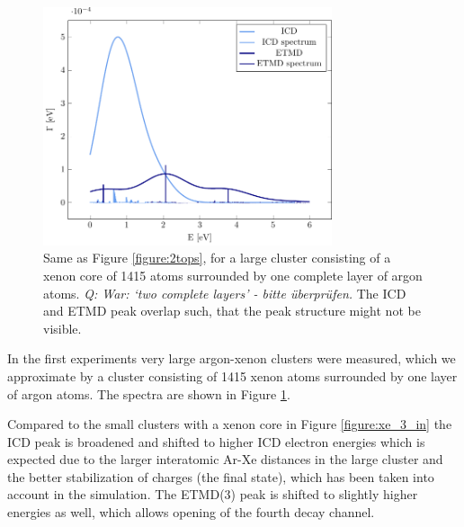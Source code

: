 \begin{figure}[ht]
 \centering
 \includegraphics[width=8.5cm]{pics/xe_8_1lay.pdf}
 \caption{Same as Figure \protect\ref{figure:2tops}, for a large cluster consisting
          of a xenon core of 1415 atoms surrounded by one complete layer of
          argon atoms. {\it Q: War: `two complete layers' - bitte \"uberpr\"ufen.} The ICD and ETMD peak overlap such, that the peak structure
          might not be visible.}
 \label{figure:xe_8_lay1}
\end{figure}
%
In the first experiments very large argon-xenon clusters were measured,\cite{Mucke_phd}
which we approximate by a cluster consisting of 1415 xenon atoms surrounded
by one layer of argon atoms. The spectra are shown in Figure
\ref{figure:xe_8_lay1}.

Compared to the small clusters with a xenon core in Figure \ref{figure:xe_3_in}
the ICD peak is broadened and shifted to higher ICD electron energies which is
expected due to the larger interatomic Ar-Xe distances in the large cluster and
the better stabilization of charges (the final state), which has been taken into account
in the simulation.
The ETMD(3) peak is shifted to slightly higher energies as well, which allows opening of the
fourth decay channel.
